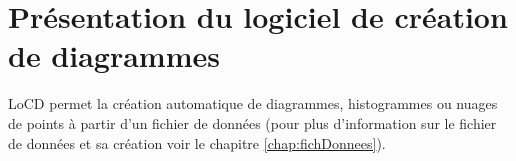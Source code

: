 \chapter{Présentation du logiciel de création de diagrammes}
LoCD permet la création automatique de diagrammes, histogrammes ou nuages de points à partir d'un fichier de données (pour plus d'information sur le fichier de données et sa création voir le chapitre \ref{chap:fichDonnees}).



